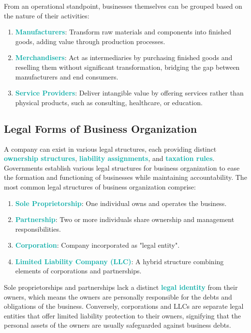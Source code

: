\documentclass[twoside]{article}
\newcommand{\highlightbluetext}[1]{\textcolor[HTML]{09ACA6}{\textbf{#1}}}
\numberwithin{equation}{section}
\begin{document}
	\newpage

	From an operational standpoint, businesses themselves can be grouped based on the nature of their activities:
	\begin{enumerate}
		\item \highlightbluetext{Manufacturers}: Transform raw materials and components into finished goods, adding value through production processes.
		\item \highlightbluetext{Merchandisers}: Act as intermediaries by purchasing finished goods and reselling them without significant transformation, bridging the gap between manufacturers and end consumers.
		\item \highlightbluetext{Service Providers}: Deliver intangible value by offering services rather than physical products, such as consulting, healthcare, or education.
	\end{enumerate}

	\subsection{Legal Forms of Business Organization}
	\label{subsec:LegalFormsOfBusinessOrganization}
	A company can exist in various legal structures, each providing distinct \highlightbluetext{ownership structures}, \highlightbluetext{liability assignments}, and \highlightbluetext{taxation rules}. Governments establish various legal structures for business organization to ease the formation and functioning of businesses while maintaining accountability. The most common legal structures of business organization comprise:
	\begin{enumerate}
		\item \highlightbluetext{Sole Proprietorship}: One individual owns and operates the business.
		\item \highlightbluetext{Partnership}: Two or more individuals share ownership and management responsibilities.
		\item \highlightbluetext{Corporation}: Company incorporated as "legal entity".
		\item \highlightbluetext{Limited Liability Company (LLC)}: A hybrid structure combining elements of corporations and partnerships.
	\end{enumerate}
	Sole proprietorships and partnerships lack a distinct \highlightbluetext{legal identity} from their owners, which means the owners are personally responsible for the debts and obligations of the business. Conversely, corporations and LLCs are separate legal entities that offer limited liability protection to their owners, signifying that the personal assets of the owners are usually safeguarded against business debts.
\end{document}
